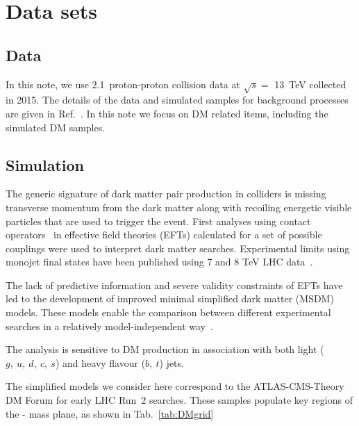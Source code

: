 \section{Data sets}
\label{sec:datasets}

\subsection{Data}


In this note, we use 2.1~\ifb proton-proton collision data at $\sqrt{s} =$ 13~TeV collected in 2015. The details of the data and
simulated samples for background processes are given in Ref.~\cite{alphaTnote}. In this note we focus on DM related items, including the simulated DM samples. 

\subsection{Simulation}

The generic signature of dark matter pair production in colliders is missing
transverse momentum from the dark matter along with recoiling energetic visible
particles that are used to trigger the event. First analyses using contact 
operators~\cite{Goodman:2010ku} in effective field theories (EFTs) calculated for a set of possible
couplings were used to interpret dark matter searches. Experimental limits using
monojet final states have been published using 7 and 8 TeV LHC 
data~\cite{Chatrchyan:2012me,ATLAS:2012ky}. 

The lack of predictive information and severe validity constraints of EFTs have
led to the development of improved minimal simplified dark matter (MSDM) models.
These models enable the comparison between different experimental
searches in a relatively model-independent way~\cite{Buchmueller:2014yoa}.

The \alphat analysis is sensitive to DM production in association with both
light ($g,~u,~d,~c,~s$) and heavy flavour ($b,~t$) jets. 

The simplified models we consider here correspond to the  ATLAS-CMS-Theory DM Forum 
for early LHC Run~2 searches. These samples populate key regions of the
{\mphi-\mchi} mass plane, as shown in Tab.~\ref{tab:DMgrid}

